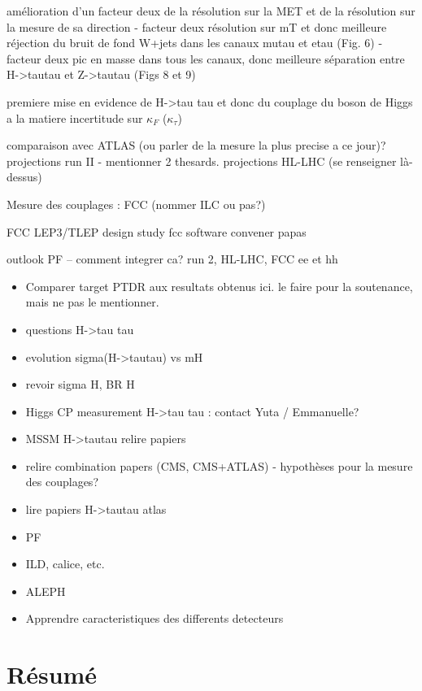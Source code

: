 \documentclass[11pt,twoside,a4paper,tdr]{cms-tdr}
\begin{document}
amélioration d'un facteur deux de la résolution sur la MET et de la résolution sur la mesure de sa direction
- facteur deux résolution sur mT et donc meilleure réjection du bruit de fond W+jets dans les canaux mutau et etau (Fig. 6)
- facteur deux pic en masse dans tous les canaux, donc meilleure séparation entre H->tautau et Z->tautau (Figs 8 et 9)

premiere mise en evidence de H->tau tau et donc du couplage du boson de Higgs a la matiere
incertitude sur $\kappa_F$ ($\kappa_\tau$)

comparaison avec ATLAS (ou parler de la mesure la plus precise a ce jour)? 
projections run II - mentionner 2 thesards. 
projections HL-LHC (se renseigner là-dessus)

Mesure des couplages : FCC (nommer ILC ou pas?) 

FCC 
LEP3/TLEP 
design study 
fcc software convener
papas 

outlook PF -- comment integrer ca? 
run 2, HL-LHC, FCC ee et hh 

\begin{itemize}
\item Comparer target PTDR aux resultats obtenus ici. le faire pour la soutenance, mais ne pas le mentionner. 
\item questions H->tau tau 
\item evolution sigma(H->tautau) vs mH
\item revoir sigma H, BR H
\item  Higgs CP measurement H->tau tau : contact Yuta / Emmanuelle? 
\item   MSSM H->tautau relire papiers
\item   relire combination papers (CMS, CMS+ATLAS) - hypothèses pour la mesure des couplages? 
\item   lire papiers H->tautau atlas
\item PF 
\item   ILD, calice, etc.
\item  ALEPH 
\item   Apprendre caracteristiques des differents detecteurs
\end{itemize}

\newpage 

\section*{Résumé}
\end{document}
